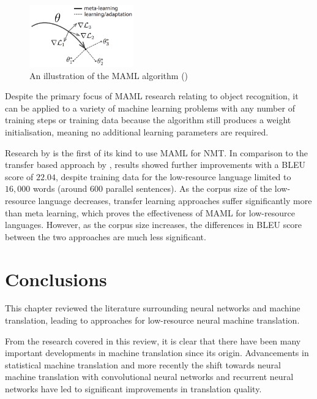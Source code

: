\begin{figure}[ht!]
\centering
\includegraphics[width=0.40\textwidth]{media/literature/nmt_approaches/maml.png}
\caption[Diagram of a \gls{MAML} algorithm]{An illustration of the \Gls{MAML} algorithm (\cite{finn_model-agnostic_2017})}
\label{fig:MAML}
\end{figure}

Despite the primary focus of \acrshort{MAML} research relating to object recognition, it can be applied to a variety of machine learning problems with any number of training steps or training data because the algorithm still produces a weight initialisation, meaning no additional learning parameters are required.


Research by \cite{gu_meta-learning_2018} is the first of its kind to use \acrshort{MAML} for \acrshort{NMT}. In comparison to the transfer based approach by \cite{zoph_transfer_2016}, results showed further improvements with a BLEU score of $22.04$, despite training data for the low-resource language limited to $16,000$ words (around $600$ parallel sentences). As the corpus size of the low-resource language decreases, transfer learning approaches suffer significantly more than meta learning, which proves the effectiveness of \acrshort{MAML} for low-resource languages. However, as the corpus size increases, the differences in BLEU score between the two approaches are much less significant.

\section{Conclusions}

This chapter reviewed the literature surrounding neural networks and machine translation, leading to approaches for low-resource neural machine translation. 

From the research covered in this review, it is clear that there have been many important developments in machine translation since its origin. Advancements in statistical machine translation and more recently the shift towards neural machine translation with convolutional neural networks and recurrent neural networks have led to significant improvements in translation quality.

